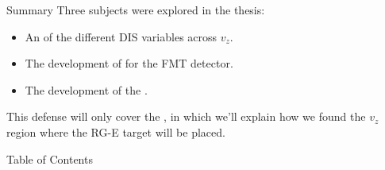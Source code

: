 \documentclass[aspectratio=169]{beamer}
\begin{document}

    \begin{frame}
        \titlepage
    \end{frame}

    \begin{frame}{Summary}
        Three subjects were explored in the thesis:

        \vspace{12pt}

        \begin{itemize}
            \item
                An  of the different DIS variables across $v_z$.

            \vspace{6pt}
            \item
                The development of  for the FMT detector.

            \vspace{6pt}
            \item
                The development of the .
        \end{itemize}

        \vspace{12pt}

        This defense will only cover the , in which we'll explain how we found the $v_z$ region where the RG-E target will be placed.
    \end{frame}

    \begin{frame}{Table of Contents}
        \tableofcontents
    \end{frame}



    \addtocounter{framenumber}{-3}

    \graphicspath{{10context/img}}
    

    \graphicspath{{11data_analysis/img}}
    

    \graphicspath{{12study_results/img}}
    

    \graphicspath{{20backup/img}}
    
\end{document}
